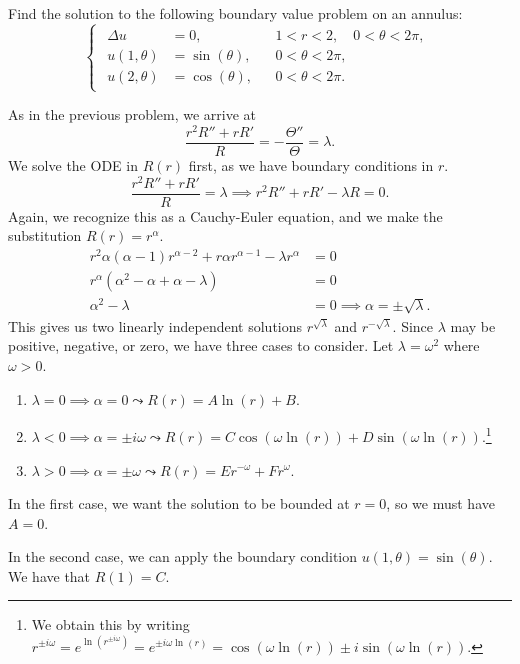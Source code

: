 \documentclass[plain]{pset}
\begin{document}
\begin{problem}
    Find the solution to the following boundary value problem on an annulus:
    \[
        \begin{cases}
            \begin{aligned}
                \Delta u     & = 0, &  & 1 < r < 2, \quad 0 < \theta < 2\pi, \\
                u(1, \theta) & = \sin(\theta), &  & 0 < \theta < 2\pi, \\
                u(2, \theta) & = \cos(\theta), &  & 0 < \theta < 2\pi.
            \end{aligned}
        \end{cases}
    \]
\end{problem}
\begin{solution}
    As in the previous problem, we arrive at
    \[\frac{r^2R'' + rR'}{R} = -\frac{\Theta''}{\Theta} = \lambda.\]
    We solve the ODE in \(R(r)\) first, as we have boundary conditions in \(r\).
    \[\frac{r^2R'' + rR'}{R} = \lambda \implies r^2R'' + rR' - \lambda R = 0.\]
    Again, we recognize this as a Cauchy-Euler equation, and we make the substitution \(R(r) = r^\alpha\).
    \begin{align*}
        r^2\alpha(\alpha - 1)r^{\alpha - 2} + r\alpha r^{\alpha - 1} - \lambda r^\alpha &= 0 \\
        r^\alpha(\alpha^2 - \alpha + \alpha - \lambda) &= 0 \\
        \alpha^2 - \lambda &= 0 \implies \alpha = \pm\sqrt{\lambda}.
    \end{align*}
    This gives us two linearly independent solutions \(r^{\sqrt{\lambda}}\) and \(r^{-\sqrt{\lambda}}\). Since \(\lambda\) may be positive, negative, or zero, we have three cases to consider. Let \(\lambda = \omega^2\) where \(\omega > 0\).
    \begin{enumerate}
        \item \(\lambda = 0 \implies \alpha = 0 \leadsto R(r) = A \ln(r) + B\).
        \item \(\lambda < 0 \implies \alpha = \pm i\omega \leadsto R(r) = C\cos(\omega\ln(r)) + D\sin(\omega\ln(r))\).\footnote{We obtain this by writing \(r^{\pm i\omega} = e^{\ln(r^{\pm i\omega})} = e^{\pm i\omega\ln(r)} = \cos(\omega\ln(r)) \pm i\sin(\omega\ln(r)).\)}
        \item \(\lambda > 0 \implies \alpha = \pm \omega \leadsto R(r) = Er^{-\omega} + Fr^{\omega}\).
    \end{enumerate}
    In the first case, we want the solution to be bounded at \(r = 0\), so we must have \(A = 0\).

    In the second case, we can apply the boundary condition \(u(1, \theta) = \sin(\theta)\). We have that \(R(1) = C\).

\end{solution}
\end{document}
